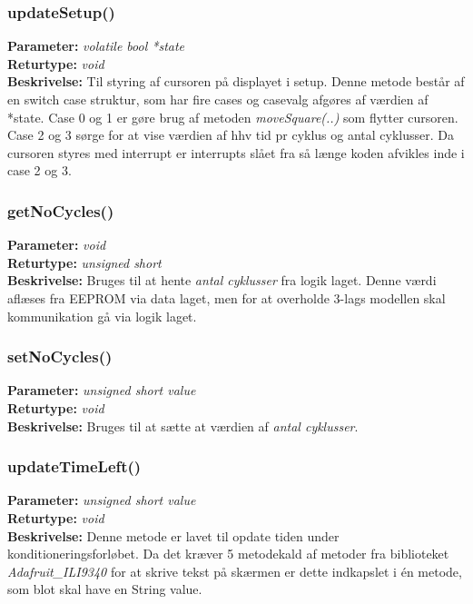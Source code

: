 \subsubsection{updateSetup()}
\textbf{Parameter: } \textit{volatile bool *state}
\\ \textbf{Returtype: } \textit{void}
\\ \textbf{Beskrivelse: } Til styring af cursoren på displayet i setup. Denne metode består af en switch case struktur, som har fire cases og casevalg afgøres af værdien af *state. Case 0 og 1 er gøre brug af metoden \textit{moveSquare(..)} som flytter cursoren. Case 2 og 3 sørge for at vise værdien af hhv tid pr cyklus og antal cyklusser. Da cursoren styres med interrupt er interrupts slået fra så længe koden afvikles inde i case 2 og 3. 

\subsubsection{getNoCycles()}
\textbf{Parameter: } \textit{void}
\\ \textbf{Returtype: } \textit{unsigned short}
\\ \textbf{Beskrivelse: } Bruges til at hente \textit{antal cyklusser} fra logik laget. Denne værdi aflæses fra EEPROM via data laget, men for at overholde 3-lags modellen skal kommunikation gå via logik laget. 

\subsubsection{setNoCycles()}
\textbf{Parameter: } \textit{unsigned short value}
\\ \textbf{Returtype: } \textit{void}
\\ \textbf{Beskrivelse: } Bruges til at sætte at værdien af \textit{antal cyklusser}. 

\subsubsection{updateTimeLeft()}
\textbf{Parameter: } \textit{unsigned short value}
\\ \textbf{Returtype: } \textit{void}
\\ \textbf{Beskrivelse: } Denne metode er lavet til opdate tiden under konditioneringsforløbet. Da det kræver 5 metodekald af metoder fra biblioteket \textit{Adafruit\_ILI9340} for at skrive tekst på skærmen er dette indkapslet i én metode, som blot skal have en String value. 

